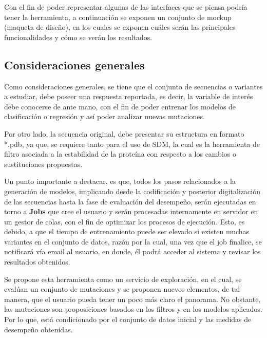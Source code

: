 Con el fin de poder representar algunas de las interfaces que se piensa podría tener la herramienta, a continuación se exponen un conjunto de mockup (maqueta de diseño), en los cuales se exponen cuáles serán las principales funcionalidades y cómo se verán los resultados.


\subsection{Consideraciones generales}

Como consideraciones generales, se tiene que el conjunto de secuencias o variantes a estudiar, debe poseer una respuesta reportada, es decir, la variable de interés debe conocerse de ante mano, con el fin de poder entrenar los modelos de clasificación o regresión y así poder analizar nuevas mutaciones. 

Por otro lado, la secuencia original, debe presentar su estructura en formato *.pdb, ya que, se requiere tanto para el uso de SDM, la cual es la herramienta de filtro asociada a la estabilidad de la proteína con respecto a los cambios o sustituciones propuestas.

Un punto importante a destacar, es que, todos los pasos relacionados a la generación de modelos, implicando desde la codificación y posterior digitalización de las secuencias hasta la fase de evaluación del desempeño, serán ejecutadas en torno a \textbf{Jobs} que cree el usuario y serán procesadas internamente en servidor en un gestor de colas, con el fin de optimizar los procesos de ejecución. Esto, es debido, a que el tiempo de entrenamiento puede ser elevado si existen muchas variantes en el conjunto de datos, razón por la cual, una vez que el job finalice, se notificará vía email al usuario, en donde, él podrá acceder al sistema y revisar los resultados obtenidos.

Se propone esta herramienta como un servicio de exploración, en el cual, se evalúan un conjunto de mutaciones y se proponen nuevos elementos, de tal manera, que el usuario pueda tener un poco más claro el panorama. No obstante, las mutaciones son proposiciones basados en los filtros y en los modelos aplicados. Por lo que, está condicionado por el conjunto de datos inicial y las medidas de desempeño obtenidas. 
